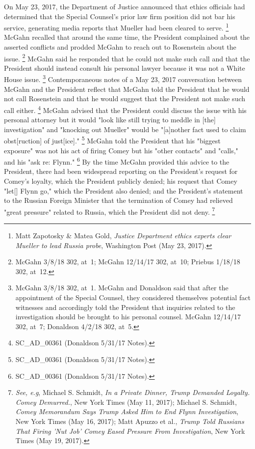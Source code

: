 {On May 23, 2017, the Department of Justice announced that ethics officials had determined that the Special Counsel's prior law firm position did not bar his service, generating media reports that Mueller had been cleared to serve.%
\footnote{Matt Zapotosky \& Matea Gold, \textit{Justice Department ethics experts clear Mueller to lead Russia probe}, Washington Post (May 23, 2017).}
McGahn recalled that around the same time, the President complained about the asserted conflicts and prodded McGahn to reach out to Rosenstein about the issue.%
\footnote{McGahn 3/8/18 302, at~1;
McGahn 12/14/17 302, at~10;
Priebus 1/18/18 302, at~12.}
McGahn said he responded that he could not make such call and that the President should instead consult his personal lawyer because it was not a White House issue.%
\footnote{McGahn 3/8/18 302, at~1.
McGahn and Donaldson said that after the appointment of the Special Counsel, they considered themselves potential fact witnesses and accordingly told the President that inquiries related to the investigation should be brought to his personal counsel.
McGahn 12/14/17 302, at~7;
Donaldson 4/2/18 302, at~5.}
Contemporaneous notes of a May 23, 2017 conversation between McGahn and the President reflect that McGahn told the President that he would not call Rosenstein and that he would suggest that the President not make such call either.%
\footnote{SC\_AD\_00361 (Donaldson 5/31/17 Notes).}
McGahn advised that the President could discuss the issue with his personal attorney but it would "look like still trying to meddle in [the] investigation" and "knocking out Mueller" would be "[a]nother fact used to claim obst[ruction] of just[ice]."%
\footnote{SC\_AD\_00361 (Donaldson 5/31/17 Notes).}
McGahn told the President that his "biggest exposure" was not his act of firing Comey but his "other contacts" and "calls," and his "ask re: Flynn."%
\footnote{SC\_AD\_00361 (Donaldson 5/31/17 Notes).}
By the time McGahn provided this advice to the President, there had been widespread reporting on the President's request for Comey's loyalty, which the President publicly denied;
his request that Comey "let[] Flynn go," which the President also denied;
and the President's statement to the Russian Foreign Minister that the termination of Comey had relieved "great pressure" related to Russia, which the President did not deny.%
\footnote{\textit{See, e.g}, Michael S. Schmidt, \textit{In a Private Dinner, Trump Demanded Loyalty. Comey Demurred.}, New York Times (May 11, 2017);
Michael S. Schmidt, \textit{Comey Memorandum Says Trump Asked Him to End Flynn Investigation}, New York Times (May 16, 2017);
Matt Apuzzo et al., \textit{Trump Told Russians That Firing 'Nut Job' Comey Eased Pressure From Investigation}, New York Times (May 19, 2017).}

}
